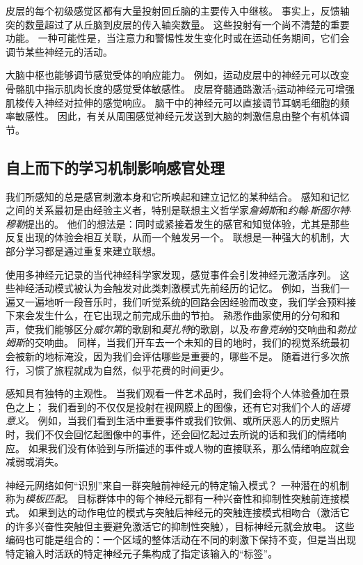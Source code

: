 皮层的每个初级感觉区都有大量投射回丘脑的主要传入中继核。
事实上，反馈轴突的数量超过了从丘脑到皮层的传入轴突数量。
这些投射有一个尚不清楚的重要功能。
一种可能性是，当注意力和警惕性发生变化时或在运动任务期间，它们会调节某些神经元的活动。


大脑中枢也能够调节感觉受体的响应能力。
例如，运动皮层中的神经元可以改变骨骼肌中指示肌肉长度的感觉受体敏感性。
皮层脊髓通路激活$\gamma$运动神经元可增强肌梭传入神经对拉伸的感觉响应。
脑干中的神经元可以直接调节耳蜗毛细胞的频率敏感性。
因此，有关从周围感觉神经元发送到大脑的刺激信息由整个有机体调节。



\subsection{自上而下的学习机制影响感官处理}

我们所感知的总是感官刺激本身和它所唤起和建立记忆的某种结合。
感知和记忆之间的关系最初是由经验主义者，特别是联想主义哲学家\textit{詹姆斯}和\textit{约翰$\cdot$斯图尔特$\cdot$穆勒}提出的。
他们的想法是：同时或紧接着发生的感官和知觉体验，尤其是那些反复出现的体验会相互关联，从而一个触发另一个。
联想是一种强大的机制，大部分学习都是通过重复来建立联想。


使用多神经元记录的当代神经科学家发现，感觉事件会引发神经元激活序列。
这些神经活动模式被认为会触发对此类刺激模式先前经历的记忆。
例如，当我们一遍又一遍地听一段音乐时，我们听觉系统的回路会因经验而改变，我们学会预料接下来会发生什么，在它出现之前完成乐曲的节拍。
熟悉作曲家使用的分句和和声，使我们能够区分\textit{威尔第}的歌剧和\textit{莫扎特}的歌剧，以及\textit{布鲁克纳}的交响曲和\textit{勃拉姆斯}的交响曲。
同样，当我们开车去一个未知的目的地时，我们的视觉系统最初会被新的地标淹没，因为我们会评估哪些是重要的，哪些不是。
随着进行多次旅行，习惯了旅程就成为自然，似乎花费的时间更少。


感知具有独特的主观性。
当我们观看一件艺术品时，我们会将个人体验叠加在景色之上；
我们看到的不仅仅是投射在视网膜上的图像，还有它对我们个人的\textit{语境意义}。
例如，当我们看到生活中重要事件或我们钦佩、或所厌恶人的历史照片时，我们不仅会回忆起图像中的事件，还会回忆起过去所说的话和我们的情绪响应。
如果我们没有体验到与所描述的事件或人物的直接联系，那么情绪响应就会减弱或消失。


神经元网络如何“识别”来自一群突触前神经元的特定输入模式？
一种潜在的机制称为\textit{模板匹配}。
目标群体中的每个神经元都有一种兴奋性和抑制性突触前连接模式。
如果到达的动作电位的模式与突触后神经元的突触连接模式相吻合（激活它的许多兴奋性突触但主要避免激活它的抑制性突触），目标神经元就会放电。 
这些编码也可能是组合的：一个区域的整体活动在不同的刺激下保持不变，但是当出现特定输入时活跃的特定神经元子集构成了指定该输入的“标签”。


